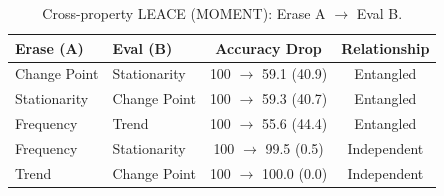 \documentclass{article}
\begin{document}
\begin{table}[tbp]
\caption{LEACE linear concept erasure: accuracy before (\%) $\to$ after (\%) (accuracy drop in parentheses) at the max-drop layer per model and property. Larger drop indicates stronger linear sensitivity. \emph{Reference diagnostic.}}
\label{tab:leace_results}
\centering
{}
\end{table}

\begin{table}[tbp]
\caption{Cross-property LEACE (MOMENT): Erase A $\to$ Eval B.}
\label{tab:cross_leace_moment}
\centering
\begin{tabular}{llcc}
\toprule
Erase (A) & Eval (B) & Accuracy Drop & Relationship \\
\midrule
Change Point & Stationarity & 100 $\to$ 59.1 (40.9) & Entangled \\
Stationarity & Change Point & 100 $\to$ 59.3 (40.7) & Entangled \\
Frequency & Trend & 100 $\to$ 55.6 (44.4) & Entangled \\
Frequency & Stationarity & 100 $\to$ 99.5 (0.5) & Independent \\
Trend & Change Point & 100 $\to$ 100.0 (0.0) & Independent \\
\bottomrule
\end{tabular}
\end{table}
\end{document}
